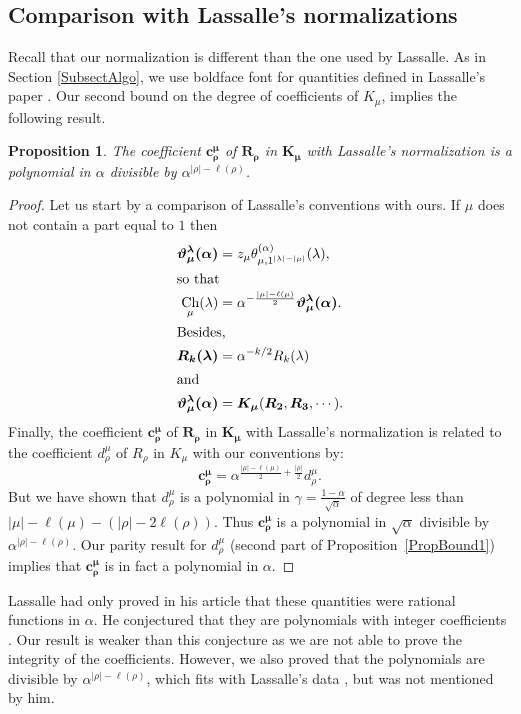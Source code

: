 \documentclass[11pt]{amsart}
\theoremstyle{plain}
\newtheorem{proposition}[lemma]{Proposition}
\theoremstyle{remark}
\DeclareMathOperator{\Ch}{Ch}
\begin{document}
\subsection{Comparison with Lassalle's normalizations}
\label{SubsectPolAvecLassalleConvention}
Recall that our normalization is different than the one used by Lassalle.
As in Section \ref{SubsectAlgo}, we use boldface font for quantities defined
in Lassalle's paper \cite{Lassalle2009}.
Our second bound on the degree of coefficients of $K_\mu$,
implies the following result.
\begin{proposition}
    The coefficient $\bm{c^\mu_\rho}$ of $\bm{R_\rho}$ in $\bm{K_\mu}$
    with Lassalle's normalization is a polynomial in $\alpha$
    divisible by
    $\alpha^{|\rho|-\ell(\rho)}$.
\end{proposition}
\begin{proof}
Let us start by a comparison of Lassalle's conventions with ours.
If $\mu$ does not contain a part equal to $1$ then
\begin{align*}
    \bm{\vartheta_\mu^\lambda(\alpha)} &=
    z_\mu \theta^{(\alpha)}_{\mu,1^{|\lambda|-|\mu|}}(\lambda),\\
    \intertext{so that } \Ch_\mu(\lambda)&=\alpha^{-\frac{|\mu|-\ell(\mu)}{2}}
     \bm{\vartheta_\mu^\lambda(\alpha)}.\\
    \intertext{Besides, } \bm{R_k(\lambda)} &= \alpha^{-k/2} R_k(\lambda) \\
    \intertext{and } \bm{\vartheta_\mu^\lambda(\alpha)} &= \bm{K_\mu} (\bm{R_2},
    \bm{R_3},\cdots).
\end{align*}
Finally, the coefficient $\bm{c^\mu_\rho}$ of $\bm{R_\rho}$ in $\bm{K_\mu}$
with Lassalle's normalization is related to the coefficient $d^\mu_\rho$ of $R_\rho$
in $K_\mu$ with our conventions by:
\[ \bm{c^\mu_\rho} = \alpha^{\frac{|\mu|-\ell(\mu)}{2}+\frac{|\rho|}{2}} d^\mu_\rho.\]
But we have shown that $d^\mu_\rho$ is a polynomial in $\gamma=\frac{1-\alpha}{\sqrt{\alpha}}$
of degree less than $|\mu|-\ell(\mu)-(|\rho|-2\ell(\rho))$.
Thus $\bm{c^\mu_\rho}$ is a polynomial in $\sqrt{\alpha}$ divisible by
$\alpha^{|\rho|-\ell(\rho)}$.
Our parity result for  $d^\mu_\rho$ (second part of Proposition~\ref{PropBound1})
implies that $\bm{c^\mu_\rho}$ is in fact a polynomial
in $\alpha$.
\end{proof}

Lassalle had only proved in his article that these quantities were rational functions
in $\alpha$.
He conjectured that they are polynomials with integer coefficients 
\cite[Conjecture 1.1]{Lassalle2009}.
Our result is weaker than this conjecture as we are not able to prove the integrity
of the coefficients.
However, we also proved that the polynomials are divisible by $\alpha^{|\rho|-\ell(\rho)}$,
which fits with
Lassalle's data \cite[Section 1]{Lassalle2009}, but was not mentioned by him.
\end{document}
